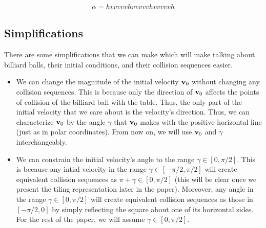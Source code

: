 \begin{eqnarray}
  \alpha = hvvvvvhvvvvvhvvvvvh
\end{eqnarray}

\subsection{Simplifications}

There are some simplifications that we can make which will make talking about billiard balls, their initial conditions, and their collision sequences easier.

\begin{itemize}
  \item We can change the magnitude of the initial velocity $\mathbf{v}_0$ without changing any collision sequences. This is because only the direction of $\mathbf{v}_0$ affects the points of collision of the billiard ball with the table. Thus, the only part of the initial velocity that we care about is the velocity's direction. Thus, we can characterize $\mathbf{v}_0$ by the angle $\gamma$ that $\mathbf{v}_0$ makes with the positive horizontal line (just as in polar coordinates). From now on, we will use $\mathbf{v}_0$ and $\gamma$ interchangeably.
  \item We can constrain the initial velocity's angle to the range $\gamma \in [0, \pi/2]$. This is because any intial velocity in the range $\gamma \in [-\pi/2, \pi/2]$ will create equivalent collision sequences as $\pi + \gamma \in [0, \pi/2]$ (this will be clear once we present the tiling representation later in the paper). Moreover, any angle in the range $\gamma \in [0, \pi/2]$ will create equivalent collision sequences as those in $[-\pi/2, 0]$ by simply reflecting the square about one of its horizontal sides. For the rest of the paper, we will assume $\gamma \in [0, \pi/2]$.
\end{itemize}
